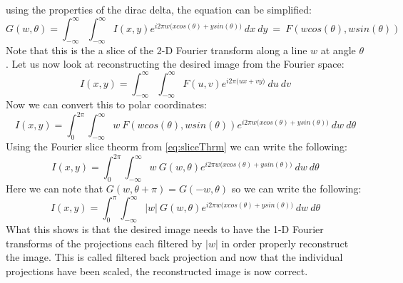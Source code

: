 using the properties of the dirac delta, the equation can be simplified:
\begin{equation}
G(w,\theta) = \int_{-\infty}^{\infty} \int_{-\infty}^{\infty} I(x,y)   e^{i2\pi w \big(xcos(\theta) + ysin(\theta) \big)} \: dx \: dy \: = \: F(wcos(\theta),wsin(\theta))
\label{eq:sliceThrm}
\end{equation}
Note that this is the a slice of the 2-D Fourier transform along a line $w$ at angle $\theta$. Let us now look at reconstructing the desired image from the Fourier space:
\begin{equation}
I(x,y) = \int_{-\infty}^{\infty} \int_{-\infty}^{\infty} F(u,v)   e^{i2\pi \big(ux + vy \big)} \: du \: dv 
\end{equation}
Now we can convert this to polar coordinates:
\begin{equation}
I(x,y) = \int_{0}^{2\pi} \int_{-\infty}^{\infty} w \: F(wcos(\theta),wsin(\theta))   e^{i2\pi w\big(xcos(\theta) + ysin(\theta) \big)} \:  dw \: d\theta
\end{equation}
Using the Fourier slice theorm from \ref{eq:sliceThrm} we can write the following:
\begin{equation}
I(x,y) = \int_{0}^{2\pi} \int_{-\infty}^{\infty} w\:  G(w,\theta)  e^{i2\pi w\big(xcos(\theta) + ysin(\theta) \big)} \:  dw \: d\theta
\end{equation}
Here we can note that $G(w,\theta + \pi) = G(-w,\theta)$ so we can write the following:
\begin{equation}
I(x,y) = \int_{0}^{\pi} \int_{-\infty}^{\infty} |w|\: G(w,\theta)  e^{i2\pi w\big(xcos(\theta) + ysin(\theta) \big)} \:  dw \: d\theta
\end{equation}
What this shows is that the desired image needs to have the 1-D Fourier transforms of the projections each filtered by $|w|$ in order properly reconstruct the image. This is called filtered back projection and now that the individual projections have been scaled, the reconstructed image is now correct. 


